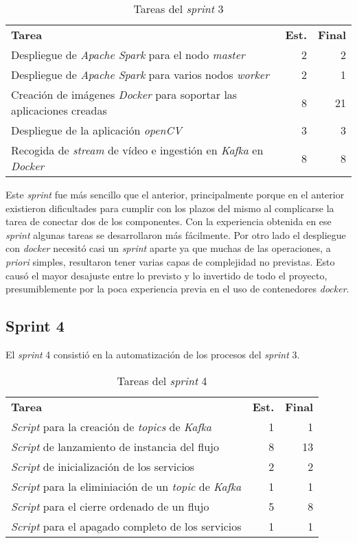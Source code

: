 \begin{table}[H]
	\begin{tabularx}{\linewidth}{X r r}
		\toprule \textbf{Tarea} & \textbf{Est.} & \textbf{Final}\\
		\otoprule
		Despliegue de \textit{Apache Spark} para el nodo \textit{master} & 2 & 2\\
		Despliegue de \textit{Apache Spark} para varios nodos \textit{worker} & 2 & 1\\
		Creación de imágenes \textit{Docker} para soportar las aplicaciones creadas & 8 & 21\\
		Despliegue de la aplicación \textit{openCV} & 3 & 3 \\
		Recogida de \textit{stream} de vídeo e ingestión en \textit{Kafka} en \textit{Docker} & 8 & 8\\
		\bottomrule
	\end{tabularx}
	\caption{Tareas del \textit{sprint} 3}
	\label{tab:sprint3}
\end{table}

Este \textit{sprint} fue más sencillo que el anterior, principalmente porque en el anterior existieron dificultades para cumplir con los plazos del mismo al complicarse la tarea de conectar dos de los componentes. Con la experiencia obtenida en ese \textit{sprint} algunas tareas se desarrollaron más fácilmente. Por otro lado el despliegue con \textit{docker} necesitó casi un \textit{sprint} aparte ya que muchas de las operaciones, a \textit{priori} simples, resultaron tener varias capas de complejidad no previstas. Esto causó el mayor desajuste entre lo previsto y lo invertido de todo el proyecto, presumiblemente por la poca experiencia previa en el uso de contenedores \textit{docker}.

\subsection{Sprint 4}

El \textit{sprint} 4 consistió en la automatización de los procesos del \textit{sprint} 3. 

\begin{table}[H]
	\begin{tabularx}{\linewidth}{X r r}
		\toprule \textbf{Tarea} & \textbf{Est.} & \textbf{Final}\\
		\otoprule
		\textit{Script} para la creación de \textit{topics} de \textit{Kafka} & 1 & 1\\
		\textit{Script} de lanzamiento de instancia del flujo & 8 & 13 \\
		\textit{Script} de inicialización de los servicios & 2 & 2\\
		\textit{Script} para la eliminiación de un \textit{topic} de \textit{Kafka} & 1 & 1\\
		\textit{Script} para el cierre ordenado de un flujo & 5 & 8\\
		\textit{Script} para el apagado completo de los servicios & 1 & 1\\
		\bottomrule
	\end{tabularx}
	\caption{Tareas del \textit{sprint} 4}
	\label{tab:sprint4}
\end{table}


